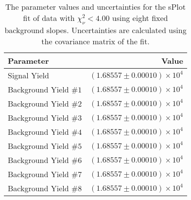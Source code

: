 
\begin{table}[ht]
    \begin{center}
        \begin{tabular}{lr}\toprule
            Parameter & Value \\\midrule
            Signal Yield & $(1.68557 \pm 0.00010) \times 10^{4}$ \\
            Background Yield $\#1$ & $(1.68557 \pm 0.00010) \times 10^{4}$ \\
            Background Yield $\#2$ & $(1.68557 \pm 0.00010) \times 10^{4}$ \\
            Background Yield $\#3$ & $(1.68557 \pm 0.00010) \times 10^{4}$ \\
            Background Yield $\#4$ & $(1.68557 \pm 0.00010) \times 10^{4}$ \\
            Background Yield $\#5$ & $(1.68557 \pm 0.00010) \times 10^{4}$ \\
            Background Yield $\#6$ & $(1.68557 \pm 0.00010) \times 10^{4}$ \\
            Background Yield $\#7$ & $(1.68557 \pm 0.00010) \times 10^{4}$ \\
            Background Yield $\#8$ & $(1.68557 \pm 0.00010) \times 10^{4}$ \\\bottomrule
        \end{tabular}
        \caption{The parameter values and uncertainties for the sPlot fit of data with $\chi^2_\nu < 4.00$ using eight fixed background slopes. Uncertainties are calculated using the covariance matrix of the fit.}\label{tab:splot-fit-results-chisqdof-4.00-fixed-8}
    \end{center}
\end{table}
